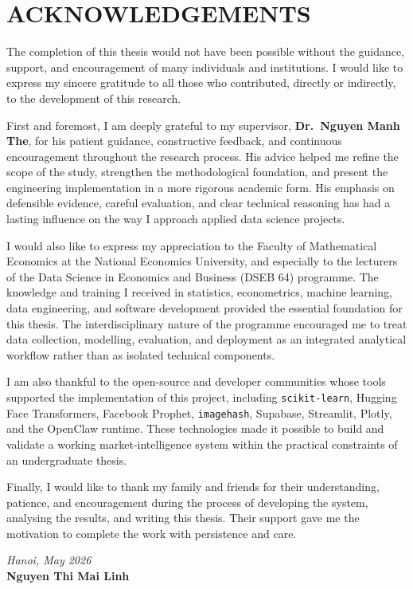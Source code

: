 \chapter*{ACKNOWLEDGEMENTS}
{}

The completion of this thesis would not have been possible without the
guidance, support, and encouragement of many individuals and
institutions. I would like to express my sincere gratitude to all those
who contributed, directly or indirectly, to the development of this
research.

First and foremost, I am deeply grateful to my supervisor,
\textbf{Dr.\ Nguyen Manh The}, for his patient guidance, constructive
feedback, and continuous encouragement throughout the research process.
His advice helped me refine the scope of the study, strengthen the
methodological foundation, and present the engineering implementation
in a more rigorous academic form. His emphasis on defensible evidence,
careful evaluation, and clear technical reasoning has had a lasting
influence on the way I approach applied data science projects.

I would also like to express my appreciation to the Faculty of
Mathematical Economics at the National Economics University, and
especially to the lecturers of the Data Science in Economics and
Business (DSEB 64) programme. The knowledge and training I received in
statistics, econometrics, machine learning, data engineering, and
software development provided the essential foundation for this thesis.
The interdisciplinary nature of the programme encouraged me to treat
data collection, modelling, evaluation, and deployment as an integrated
analytical workflow rather than as isolated technical components.

I am also thankful to the open-source and developer communities whose
tools supported the implementation of this project, including
\texttt{scikit-learn}, Hugging Face Transformers, Facebook Prophet,
\texttt{imagehash}, Supabase, Streamlit, Plotly, and the OpenClaw
runtime. These technologies made it possible to build and validate a
working market-intelligence system within the practical constraints of
an undergraduate thesis.

Finally, I would like to thank my family and friends for their
understanding, patience, and encouragement during the process of
developing the system, analysing the results, and writing this thesis.
Their support gave me the motivation to complete the work with
persistence and care.

\vspace{1cm}
\begin{flushright}
  \textit{Hanoi, May 2026}\\
  \textbf{Nguyen Thi Mai Linh}
\end{flushright}
